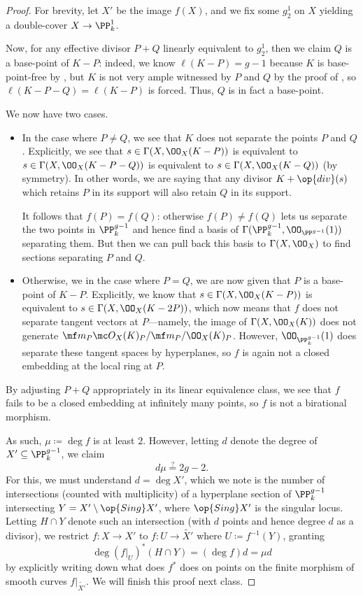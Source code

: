 \documentclass[../notes.tex]{subfiles}
\begin{document}
\begin{proof}
	For brevity, let $X'$ be the image $f(X)$, and we fix some $g^1_2$ on $X$ yielding a double-cover $X\to\PP^1_k$.
	
	Now, for any effective divisor $P+Q$ linearly equivalent to $g^1_2$, then we claim $Q$ is a base-point of $K-P$: indeed, we know $\ell(K-P)=g-1$ because $K$ is base-point-free by , but $K$ is not very ample witnessed by $P$ and $Q$ by the proof of , so $\ell(K-P-Q)=\ell(K-P)$ is forced. Thus, $Q$ is in fact a base-point.

	We now have two cases.
	\begin{itemize}
		\item In the case where $P\ne Q$, we see that $K$ does not separate the points $P$ and $Q$. Explicitly, we see that $s\in\Gamma(X,\OO_X(K-P))$ is equivalent to $s\in\Gamma(X,\OO_X(K-P-Q))$ is equivalent to $s\in\Gamma(X,\OO_X(K-Q))$ (by symmetry). In other words, we are saying that any divisor $K+\op{div}(s)$ which retains $P$ in its support will also retain $Q$ in its support.
		
		It follows that $f(P)=f(Q)$: otherwise $f(P)\ne f(Q)$ lets us separate the two points in $\PP^{g-1}_k$ and hence find a basis of $\Gamma(\PP^{g-1}_k,\OO_{\PP^{g-1}}(1))$ separating them. But then we can pull back this basis to $\Gamma(X,\OO_X)$ to find sections separating $P$ and $Q$.

		\item Otherwise, we in the case where $P=Q$, we are now given that $P$ is a base-point of $K-P$. Explicitly, we know that $s\in\Gamma(X,\OO_X(K-P))$ is equivalent to $s\in\Gamma(X,\OO_X(K-2P))$, which now means that $f$ does not separate tangent vectors at $P$---namely, the image of $\Gamma(X,\OO_X(K))$ does not generate $\mf m_P\mc O_X(K)_P/\mf m_P/\OO_X(K)_P$. However, $\OO_{\PP^{g-1}_k}(1)$ does separate these tangent spaces by hyperplanes, so $f$ is again not a closed embedding at the local ring at $P$.
	\end{itemize}
	By adjusting $P+Q$ appropriately in its linear equivalence class, we see that $f$ fails to be a closed embedding at infinitely many points, so $f$ is not a birational morphism.

	As such, $\mu\coloneqq\deg f$ is at least $2$. However, letting $d$ denote the degree of $X'\subseteq\PP^{g-1}_k$, we claim
	\[d\mu\stackrel?=2g-2.\]
	For this, we must understand $d=\deg X'$, which we note is the number of intersections (counted with multiplicity) of a hyperplane section of $\PP^{g-1}_k$ intersecting $Y=X'\setminus\op{Sing}X'$, where $\op{Sing}X'$ is the singular locus. Letting $H\cap Y$ denote such an intersection (with $d$ points and hence degree $d$ as a divisor), we restrict $f\colon X\to X'$ to $f\colon U\to\widetilde{X'}$ where $U\coloneqq f^{-1}(Y)$, granting
	\[\deg (f|_U)^*(H\cap Y)=(\deg f)d=\mu d\]
	by explicitly writing down what does $f^*$ does on points on the finite morphism of smooth curves $f|_{\widetilde{X'}}$. We will finish this proof next class.
\end{proof}
\end{document}
